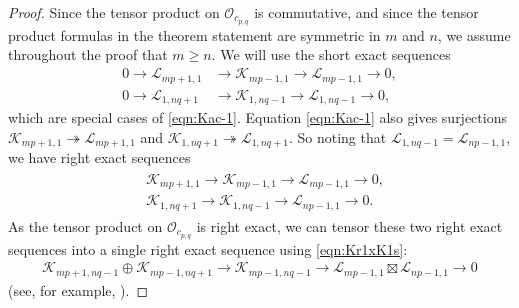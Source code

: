 \documentclass[pdftex]{sigma}
\numberwithin{equation}{section}
\theoremstyle{definition}
\begin{document}
\begin{proof}
Since the tensor product on $\mathcal{O}_{c_{p,q}}$ is commutative, and since the tensor product formulas in the theorem statement are symmetric in $m$ and $n$, we assume throughout the proof that $m\geq n$. We will use the short exact sequences
\begin{align*}
0 \longrightarrow \mathcal{L}_{mp+1, 1} & \longrightarrow \mathcal{K}_{mp-1, 1} \longrightarrow \mathcal{L}_{mp-1, 1} \longrightarrow 0,\\
0 \longrightarrow \mathcal{L}_{1, nq+1} & \longrightarrow \mathcal{K}_{1, nq-1} \longrightarrow \mathcal{L}_{1, nq-1} \longrightarrow 0,
\end{align*}
which are special cases of \eqref{eqn:Kac-1}. Equation \eqref{eqn:Kac-1} also gives surjections $\mathcal{K}_{mp+1,1}\twoheadrightarrow\mathcal{L}_{mp+1,1}$ and $\mathcal{K}_{1,nq+1}\twoheadrightarrow\mathcal{L}_{1,nq+1}$. So noting that $\mathcal{L}_{1,nq-1}=\mathcal{L}_{np-1,1}$, we have right exact sequences
\begin{align*}
\begin{split}
&\mathcal{K}_{mp+1, 1} \longrightarrow \mathcal{K}_{mp-1, 1} \longrightarrow \mathcal{L}_{mp-1, 1} \longrightarrow 0,\\
&\mathcal{K}_{1, nq+1} \longrightarrow \mathcal{K}_{1, nq-1} \longrightarrow \mathcal{L}_{np-1,1} \longrightarrow 0.
\end{split}
\end{align*}
As the tensor product on $\mathcal{O}_{c_{p,q}}$ is right exact, we can tensor these two right exact sequences into a single right exact sequence using \eqref{eqn:Kr1xK1s}:
\begin{gather}\label{eqn:right-exact}
\mathcal{K}_{mp+1,nq-1}\oplus\mathcal{K}_{mp-1,nq+1}\longrightarrow\mathcal{K}_{mp-1,nq-1}\longrightarrow\mathcal{L}_{mp-1,1}\boxtimes\mathcal{L}_{np-1,1}\longrightarrow 0
\end{gather}
(see, for example, \cite[Lemma 2.5]{McR-Deligne}).


\end{proof}
\end{document}
